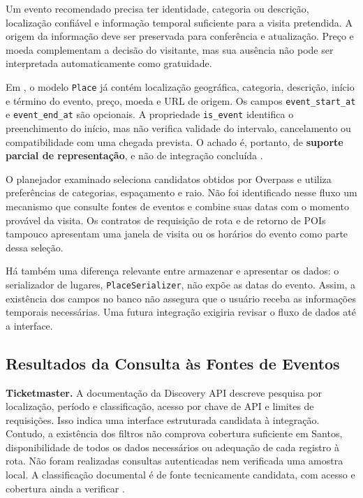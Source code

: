Um evento recomendado precisa ter identidade, categoria ou descrição, localização confiável e informação temporal suficiente para a visita pretendida. A origem da informação deve ser preservada para conferência e atualização. Preço e moeda complementam a decisão do visitante, mas sua ausência não pode ser interpretada automaticamente como gratuidade.

Em , o modelo \texttt{Place} já contém localização geográfica, categoria, descrição, início e término do evento, preço, moeda e URL de origem. Os campos \texttt{event\_start\_at} e \texttt{event\_end\_at} são opcionais. A propriedade \texttt{is\_event} identifica o preenchimento do início, mas não verifica validade do intervalo, cancelamento ou compatibilidade com uma chegada prevista. O achado é, portanto, de \textbf{suporte parcial de representação}, e não de integração concluída \parencite{explora2026codigo}.

O planejador examinado seleciona candidatos obtidos por Overpass e utiliza preferências de categorias, espaçamento e raio. Não foi identificado nesse fluxo um mecanismo que consulte fontes de eventos e combine suas datas com o momento provável da visita. Os contratos de requisição de rota e de retorno de POIs tampouco apresentam uma janela de visita ou os horários do evento como parte dessa seleção.

Há também uma diferença relevante entre armazenar e apresentar os dados: o serializador de lugares, \texttt{PlaceSerializer}, não expõe as datas do evento. Assim, a existência dos campos no banco não assegura que o usuário receba as informações temporais necessárias. Uma futura integração exigiria revisar o fluxo de dados até a interface.

\subsection{Resultados da Consulta às Fontes de Eventos}

\textbf{Ticketmaster.} A documentação da Discovery API descreve pesquisa por localização, período e classificação, acesso por chave de API e limites de requisições. Isso indica uma interface estruturada candidata à integração. Contudo, a existência dos filtros não comprova cobertura suficiente em Santos, disponibilidade de todos os dados necessários ou adequação de cada registro à rota. Não foram realizadas consultas autenticadas nem verificada uma amostra local. A classificação documental é de fonte tecnicamente candidata, com acesso e cobertura ainda a verificar \parencite{ticketmaster2026}.

